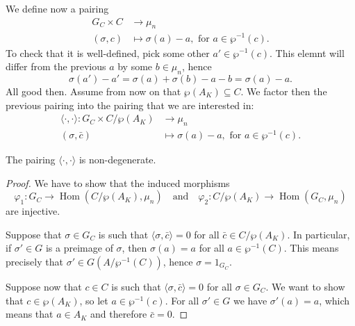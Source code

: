 \documentclass[12pt]{amsart}
\DeclareMathOperator{\Hom}{Hom}
\begin{document}
We define now a pairing
\begin{align*}
    G_{C}\times C &\longrightarrow \mu_{n} \\
    (\sigma,c) &\longmapsto \sigma(a)-a, \text{ for }a\in \wp^{-1}(c).
\end{align*}
To check that it is well-defined, pick some other $a'\in \wp^{-1}(c)$.
This elemnt will differ from the previous $a$ by some $b\in \mu_{n}$, hence
\[ \sigma(a')-a'=\sigma(a)+\sigma(b)-a-b=\sigma(a)-a. \]
All good then.
Assume from now on that $\wp(A_{K})\subseteq C$.
We factor then the previous pairing into the pairing that we are interested in:
\begin{align*}
    \langle \cdot,\cdot\rangle \colon G_{C}\times C/\wp(A_{K}) &\longrightarrow \mu_{n} \\
    (\sigma,\bar{c}) & \longmapsto \sigma(a)-a, \text{ for }a\in \wp^{-1}(c).
\end{align*}

\begin{lm}
    The pairing $\langle \cdot,\cdot\rangle$ is non-degenerate.
    \begin{proof}
	We have to show that the induced morphisms
	\[ \varphi_{1}\colon G_{C}\to \Hom(C/\wp(A_{K}),\mu_{n}) \quad\text{and}\quad \varphi_{2}\colon C/\wp(A_{K})\to \Hom(G_{C},\mu_{n}) \]
	are injective.

	Suppose that $\sigma\in G_{C}$ is such that $\langle \sigma,\bar{c}\rangle=0$ for all $\bar{c}\in C/\wp(A_{K})$.
	In particular, if $\sigma'\in G$ is a preimage of $\sigma$, then $\sigma(a)=a$ for all $a\in \wp^{-1}(C)$.
	This means precisely that $\sigma'\in G(A/\wp^{-1}(C))$, hence $\sigma=1_{G_{C}}$.

	Suppose now that $c\in C$ is such that $\langle \sigma, \bar{c}\rangle=0$ for all $\sigma\in G_{C}$.
	We want to show that $c\in \wp(A_{K})$, so let $a\in \wp^{-1}(c)$.
	For all $\sigma'\in G$ we have $\sigma'(a)=a$, which means that $a\in A_{K}$ and therefore $\bar{c}=0$.

    \end{proof}
\end{lm}


\newpage


\vfill
\end{document}
